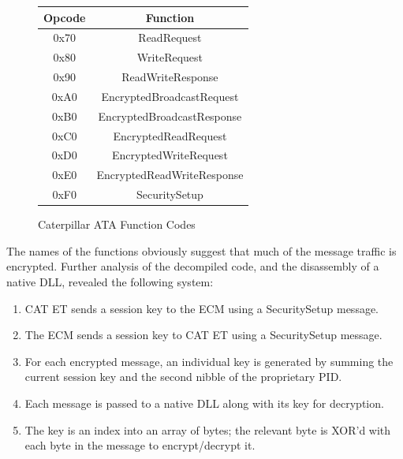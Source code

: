 \begin{figure}[h]
\centering
\begin{table}
 \begin{center}
   \begin{tabular}{|c|c|}
    \hline
    Opcode & Function \\
    \hline
    0x70 & ReadRequest \\
    \hline
    0x80 & WriteRequest \\
    \hline
    0x90 & ReadWriteResponse\\
    \hline
    0xA0 & EncryptedBroadcastRequest\\
    \hline
    0xB0 & EncryptedBroadcastResponse\\
    \hline
    0xC0 & EncryptedReadRequest\\
    \hline
    0xD0 & EncryptedWriteRequest\\
    \hline
    0xE0 & EncryptedReadWriteResponse\\
    \hline
    0xF0 & SecuritySetup\\
    \hline
   \end{tabular}

 \end{center}
\end{table}
\caption{Caterpillar ATA Function Codes}
\label{fig:catet}
\end{figure}

The names of the functions obviously suggest that much of the message traffic is encrypted. Further analysis of the
decompiled code, and the disassembly of a native DLL,  revealed the following system:

\begin{enumerate}
  \item CAT ET sends a session key to the ECM using a SecuritySetup message.
  \item The ECM sends a session key to CAT ET using a SecuritySetup message.
  \item For each encrypted message, an individual key is generated by summing the
        current session key and the second nibble of the proprietary PID.
  \item Each message is passed to a native DLL along with its key for decryption.
  \item The key is an index into an array of bytes; the relevant byte is XOR'd
        with each byte in the message to encrypt/decrypt it.
\end{enumerate}


